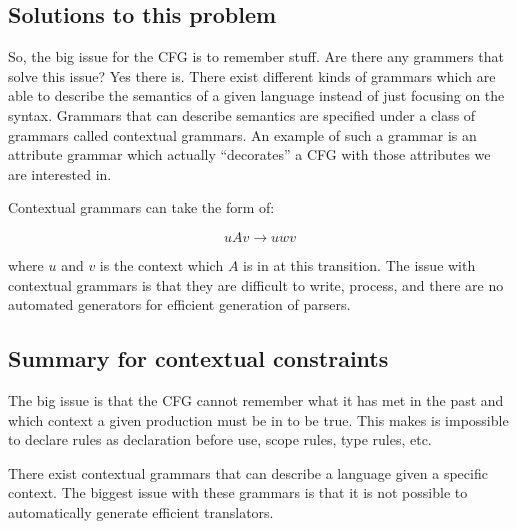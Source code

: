 \subsection{Solutions to this problem}
So, the big issue for the CFG is to remember stuff. Are there any grammers that
solve this issue? Yes there is. There exist different kinds of grammars which
are able to describe the semantics of a given language instead of just focusing
on the syntax. Grammars that can describe semantics are specified under a class
of grammars called contextual grammars.
\cite{plpp}
An example of such a grammar is an attribute grammar which actually
``decorates'' a CFG with those attributes we are interested in.
\cite{attrgrammar}

Contextual grammars can take the form of:

\[
  uAv \rightarrow uwv
\]

where $u$ and $v$ is the context which $A$ is in at this transition. The issue
with contextual grammars is that they are difficult to write, process, and there 
are no automated generators for efficient generation of parsers.
\cite{attrgrammar}

\subsection{Summary for contextual constraints}
The big issue is that the CFG cannot remember what it has met in the past and
which context a given production must be in to be true. This makes is impossible
to declare rules as declaration before use, scope rules, type rules, etc.

There exist contextual grammars that can describe a language given a specific
context. The biggest issue with these grammars is that it is not possible to
automatically generate efficient translators.


